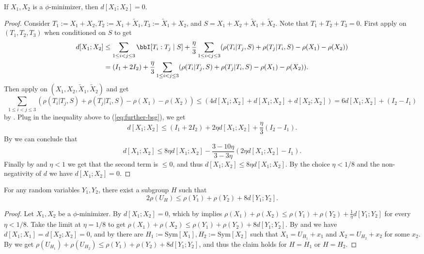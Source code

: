 \begin{proposition}\label{phi-minimizer-zero-distance}\leanok  If $X_1,X_2$ is a $\phi$-minimizer, then $d[X_1;X_2] = 0$.
\end{proposition}

\begin{proof}\leanok
Consider $T_1:=X_1+X_2,T_2:=X_1+\tilde X_1, T_3:=\tilde X_1 + X_2$, and $S=X_1+X_2+\tilde X_1 + \tilde X_2$. Note that $T_1+T_2+T_3=0$.
First apply  on $(T_1,T_2,T_3)$ when conditioned on $S$ to get
\begin{align}  \label{eq:further-bsg}
d[X_1;X_2] &\leq  \sum_{1 \leq i<j \leq 3} \bbI[T_i:T_j\mid S] + \frac{\eta}{3}   \sum_{1 \leq i<j \leq 3} (\rho(T_i|T_j,S) + \rho(T_j|T_i,S) -\rho(X_1)-\rho(X_2))\nonumber\\
&= (I_1+2I_2) + \frac{\eta}{3}   \sum_{1 \leq i<j \leq 3} (\rho(T_i|T_j,S) + \rho(T_j|T_i,S) -\rho(X_1)-\rho(X_2)).
\end{align}
Then apply  on $(X_1,X_2,\tilde X_1,\tilde X_2)$ and get
$$\sum_{1 \leq i<j \leq 3} (\rho(T_i|T_j,S) + \rho(T_j|T_i,S) -  \rho(X_1)-\rho(X_2))\le (4d[X_1;X_2]+d[X_1;X_2]+d[X_2;X_2])= 6 d[X_1;X_2]+(I_2-I_1)$$
by . Plug in the inequality above to (\ref{eq:further-bsg}), we get
$$d[X_1;X_2] \le (I_1+2I_2)+2\eta d[X_1;X_2]+\frac{\eta}{3}(I_2-I_1).$$
By  we can conclude that
$$d[X_1;X_2] \le 8\eta d[X_1;X_2]-\frac{3-10\eta}{3-3\eta} (2\eta d[X_1;X_2]-I_1).$$
Finally by  and $\eta<1$ we get that the second term is $\le 0$, and thus $d[X_1;X_2] \le 8\eta d[X_1;X_2]$. By the choice $\eta<1/8$ and the non-negativity of $d$ we have $d[X_1;X_2]=0$.
\end{proof}


\begin{proposition} \label{pfr-rho}\leanok For any random variables $Y_1,Y_2$, there exist a subgroup $H$ such that
  $$ 2\rho(U_H) \leq \rho(Y_1) + \rho(Y_2) + 8 d[Y_1;Y_2].$$
\end{proposition}

\begin{proof}\leanok
Let $X_1,X_2$ be a $\phi$-minimizer. By  $d[X_1;X_2]=0$, which by  implies $\rho(X_1)+\rho(X_2)\le \rho(Y_1) + \rho(Y_2) + \frac{1}{\eta} d[Y_1;Y_2]$ for every $\eta<1/8$. Take the limit at $\eta=1/8$ to get $\rho(X_1)+\rho(X_2)\le \rho(Y_1) + \rho(Y_2) + 8 d[Y_1;Y_2]$.
By  and  we have $d[X_1;X_1]=d[X_2;X_2]=0$, and by  there are $H_1:=\mathrm{Sym}[X_1],H_2:=\mathrm{Sym}[X_2]$ such that $X_1=U_{H_1}+x_1$ and $X_2=U_{H_2}+x_2$ for some $x_2$.
By  we get $\rho(U_{H_1})+\rho(U_{H_2})\le \rho(Y_1) + \rho(Y_2) + 8 d[Y_1;Y_2]$, and thus the claim holds for $H=H_1$ or $H=H_2$.
\end{proof}

